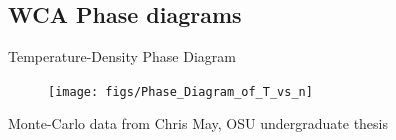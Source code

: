 \documentclass{beamer}
\renewcommand{\vec}[1]{\mathbf{#1}}
\begin{document}









\subsection*{WCA Phase diagrams}
\begin{frame}{Temperature-Density Phase Diagram}
    \begin{figure}
        \centering
        \texttt{[image: figs/Phase\_Diagram\_of\_T\_vs\_n]}\\
    \end{figure}        
    \vspace{-1em}
    \small *Monte-Carlo data from Chris May, OSU undergraduate thesis
\end{frame}
\end{document}
